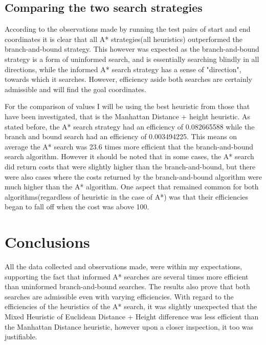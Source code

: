 \documentclass[11pt,oneside]{article}
\begin{document}
\subsection{Comparing the two search strategies}
According to the observations made by running the test pairs of start and end coordinates it is clear that all A* strategies(all heuristics) outperformed the branch-and-bound strategy. This however was expected as the branch-and-bound strategy is a form of uninformed search, and is essentially searching blindly in all directions, while the informed A* search strategy has a sense of "direction", towards which it searches. However, efficiency aside both searches are certainly admissible and will find the goal coordinates.

For the comparison of values I will be using the best heuristic from those that have been investigated, that is the Manhattan Distance + height heuristic. As stated before, the A* search strategy had an efficiency of 0.082665588 while the branch and bound search had an efficiency of 0.003494225. This means on average the A* search was 23.6 times more efficient that the branch-and-bound search algorithm. However it should be noted that in some cases, the A* search did return costs that were slightly higher than the branch-and-bound, but there were also cases where the costs returned by the branch-and-bound algorithm were much higher than the A* algorithm. One aspect that remained common for both algorithms(regardless of heuristic in the case of A*) was that their efficiencies began to fall off when the cost was above 100.

\section{Conclusions}
All the data collected and observations made, were within my expectations, supporting the fact that informed A* searches are several times more efficient than uninformed branch-and-bound searches. The results also prove that both searches are admissible even with varying efficiencies. With regard to the efficiencies of the heuristics of the A* search, it was slightly unexpected that the Mixed Heuristic of Euclidean Distance + Height difference was less efficient than the Manhattan Distance heuristic, however upon a closer inspection, it too was justifiable.
\end{document}
